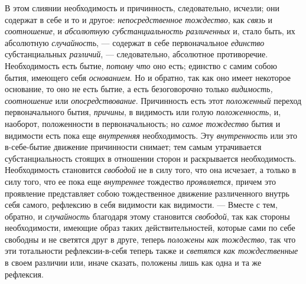 \label{bkm:bm93a}В этом слиянии необходимость и причинность, следовательно,
исчезли; они содержат в себе и то и другое:
{\em непосредственное тождество}, как
{\em связь} и {\em соотношение}, и
{\em абсолютную субстанциальность различенных} и, стало
быть, их абсолютную {\em случайность}, — содержат в
себе первоначальное {\em единство} субстанциальных
{\em различий}, — следовательно, абсолютное
противоречие. Необходимость есть бытие, {\em потому
что} оно есть; единство с самим собою бытия, имеющего себя
{\em основанием}. Но и обратно, так как оно имеет
некоторое основание, то оно не есть бытие, а есть безоговорочно только
{\em видимость, соотношение} или
{\em опосредствование}. Причинность есть этот
{\em положенный} переход первоначального бытия,
{\em причины}, в видимость или голую
{\em положенность}, и, наоборот, положенности в
первоначальность; но {\em самое тождество} бытия и
видимости есть пока еще {\em внутренняя} необходимость.
Эту {\em внутренность} или это в-себе-бытие движение
причинности снимает; тем самым утрачивается субстанциальность стоящих в
отношении сторон и раскрывается необходимость. Необходимость становится
{\em свободой} не в силу того, что она исчезает, а
только в силу того, что ее пока еще {\em внутреннее}
тождество {\em проявляется}, причем это проявление
представляет собою тождественное движение различенного внутрь себя самого,
рефлексию в себя видимости как видимости. — Вместе с тем, обратно, и
{\em случайность} благодаря этому становится
{\em свободой}, так как стороны необходимости, имеющие
образ таких действительностей, которые сами по себе свободны и не светятся
друг в друге, теперь {\em положены как тождество}, так
что эти тотальности рефлексии-в-себя теперь также и
{\em светятся} {\em как
тождественные} в своем различии или, иначе сказать, положены лишь как одна
и та же рефлексия.

